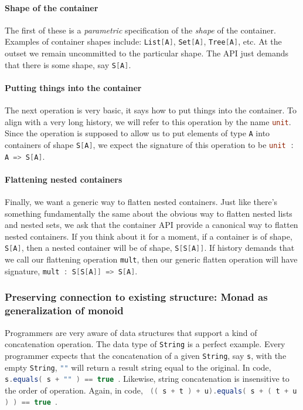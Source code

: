 \paragraph{Shape of the container} The first of these is a
\emph{parametric} specification of the \emph{shape} of the
container. Examples of container shapes include: \lstinline[language=Scala]!List[A]!,
\lstinline[language=Scala]!Set[A]!, \lstinline[language=Scala]!Tree[A]!, etc. At the outset we remain
uncommitted to the particular shape. The API just demands that
there is some shape, say \lstinline[language=Scala]!S[A]!.
\paragraph{Putting things into the container} The next operation is
very basic, it says how to put things into the container. To align
with a very long history, we will refer to this operation by the name
\lstinline[language=Scala]!unit!. Since the operation is supposed to allow us to put
elements of type \lstinline[language=Scala]!A! into containers of shape \lstinline[language=Scala]!S[A]!, we
expect the signature of this operation to be \lstinline[language=Scala]!unit : A => S[A]!.
\paragraph{Flattening nested containers} Finally, we want a generic
way to flatten nested containers. Just like there's something
fundamentally the same about the obvious way to flatten nested lists
and nested sets, we ask that the container API provide a canonical way
to flatten nested containers. If you think about it for a moment, if a
container is of shape, \lstinline[language=Scala]!S[A]!, then a nested container will be
of shape, \lstinline[language=Scala]!S[S[A]]!. If history demands that we call our
flattening operation \lstinline[language=Scala]!mult!, then our generic flatten operation
will have signature, \lstinline[language=Scala]!mult : S[S[A]] => S[A]!.

\subsubsection{Preserving connection to existing structure: Monad as
  generalization of monoid}

Programmers are very aware of data structures that support a kind of
concatenation operation. The data type of \lstinline[language=Scala]!String! is a perfect
example. Every programmer expects that the concatenation of a given
\lstinline[language=Scala]!String!, say \lstinline[language=Scala]!s!, with the empty \lstinline[language=Scala]!String!,
\lstinline[language=Scala]!""! will return a result string equal to the original. In
code, \lstinline[language=Scala]! s.equals( s + "" ) == true !. Likewise, string
concatenation is insensitive to the order of operation. Again, in
code, \lstinline[language=Scala]! (( s + t ) + u).equals( s + ( t + u ) ) == true !.

